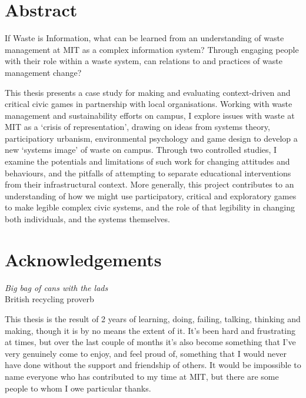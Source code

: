 \documentclass[nofonts,nols,justified,nobib]{tufte-book}
\begin{document}

\renewcommand{\thepage}{\roman{page}}





\newpage

\chapter*{Abstract}

If Waste is Information, what can be learned from an understanding of waste management at MIT as a complex information system? Through engaging people with their role within a waste system, can relations to and practices of waste management change? 

This thesis presents a case study for making and evaluating context-driven and critical civic games in partnership with local organisations. Working with waste management and sustainability efforts on campus, I explore issues with waste at MIT as a `crisis of representation', drawing on ideas from systems theory, participatiory urbanism, environmental psychology and game design to develop a new `systems image' of waste on campus. Through two controlled studies, I examine the potentials and limitations of such work for changing attitudes and behaviours, and the pitfalls of attempting to separate educational interventions from their infrastructural context. More generally, this project contributes to an understanding of how we might use participatory, critical and exploratory games to make legible complex civic systems, and the role of that legibility in changing both individuals, and the systems themselves.

\newpage


\chapter*{Acknowledgements}

\begin{flushright}
\emph{Big bag of cans with the lads}\\
British recycling proverb
\end{flushright}

This thesis is the result of 2 years of learning, doing, failing, talking, thinking and making, though it is by no means the extent of it. It's been hard and frustrating at times, but over the last couple of months it's also become something that I've very genuinely come to enjoy, and feel proud of, something that I would never have done without the support and friendship of others. It would be impossible to name everyone who has contributed to my time at MIT, but there are some people to whom I owe particular thanks.
\end{document}
